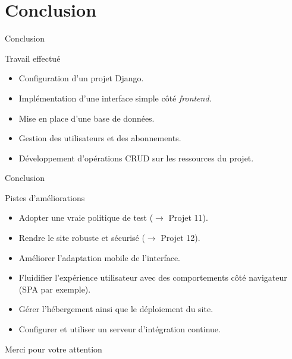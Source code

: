 \section{Conclusion}

\begin{frame}{Conclusion}
  \begin{block}{Travail effectué}
    \begin{itemize}
    \item Configuration d'un projet Django.
    \item Implémentation d'une interface simple côté \textit{frontend}.
    \item Mise en place d'une base de données.
    \item Gestion des utilisateurs et des abonnements.
    \item Développement d'opérations CRUD sur les ressources du projet.
    \end{itemize}
  \end{block}
\end{frame}

\begin{frame}{Conclusion}
  \begin{block}{Pistes d'améliorations}
    \begin{itemize}
    \item Adopter une vraie politique de test ($\rightarrow$ Projet 11).
    \item Rendre le site robuste et sécurisé ($\rightarrow$ Projet 12).
    \item Améliorer l'adaptation mobile de l'interface.
    \item Fluidifier l'expérience utilisateur avec des comportements
      côté navigateur (SPA par exemple).
    \item Gérer l'hébergement ainsi que le déploiement du site.
    \item Configurer et utiliser un serveur d'intégration continue.
    \end{itemize}
  \end{block}
\end{frame}


\begin{frame}{Merci pour votre attention}
  \tableofcontents
\end{frame}

